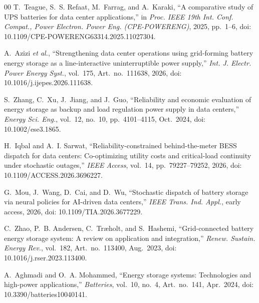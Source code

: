 \documentclass{ieeeaccess}
\begin{document}
\begin{thebibliography}{00}
T.~Teague, S.~S. Refaat, M.~Farrag, and A.~Karaki, ``A comparative study of UPS batteries for data center applications,'' in \emph{Proc. IEEE 19th Int. Conf. Compat., Power Electron. Power Eng. (CPE-POWERENG)}, 2025, pp.~1--6, doi: 10.1109/CPE-POWERENG63314.2025.11027304.

A.~Azizi \emph{et al.}, ``Strengthening data center operations using grid-forming battery energy storage as a line-interactive uninterruptible power supply,'' \emph{Int. J. Electr. Power Energy Syst.}, vol.~175, Art.~no.~111638, 2026, doi: 10.1016/j.ijepes.2026.111638.

S.~Zhang, C.~Xu, J.~Jiang, and J.~Guo, ``Reliability and economic evaluation of energy storage as backup and load regulation power supply in data centers,'' \emph{Energy Sci. Eng.}, vol.~12, no.~10, pp.~4101--4115, Oct.~2024, doi: 10.1002/ese3.1865.

H.~Iqbal and A.~I. Sarwat, ``Reliability-constrained behind-the-meter BESS dispatch for data centers: Co-optimizing utility costs and critical-load continuity under stochastic outages,'' \emph{IEEE Access}, vol.~14, pp.~79227--79252, 2026, doi: 10.1109/ACCESS.2026.3696227.

G.~Mou, J.~Wang, D.~Cai, and D.~Wu, ``Stochastic dispatch of battery storage via neural policies for AI-driven data centers,'' \emph{IEEE Trans. Ind. Appl.}, early access, 2026, doi: 10.1109/TIA.2026.3677229.

C.~Zhao, P.~B. Andersen, C.~Tr{\ae}holt, and S.~Hashemi, ``Grid-connected battery energy storage system: A review on application and integration,'' \emph{Renew. Sustain. Energy Rev.}, vol.~182, Art.~no.~113400, Aug.~2023, doi: 10.1016/j.rser.2023.113400.

A.~Aghmadi and O.~A. Mohammed, ``Energy storage systems: Technologies and high-power applications,'' \emph{Batteries}, vol.~10, no.~4, Art.~no.~141, Apr.~2024, doi: 10.3390/batteries10040141.

\end{thebibliography}
\end{document}
